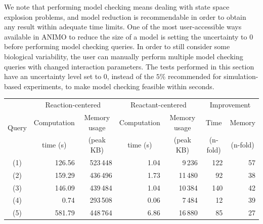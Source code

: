 \documentclass{llncs}
\begin{document}
We note that performing model checking means dealing with state space explosion problems,
and model reduction is recommendable in order to obtain any result within adequate time limits. One of the
most user-accessible ways available in ANIMO to reduce the size of a model is setting the uncertainty to 0
before performing model checking queries.
In order to still consider some biological variability, the user can manually perform multiple model checking queries with changed interaction parameters.
The tests performed in this section have an uncertainty level set to 0, instead of the $5\%$ recommended for simulation-based experiments, to
make model checking feasible within seconds.


\begin{table}[htbp]
  \begin{center}
    \begin{tabular}{|c||r|r||r|r||r|r|}
      \hline
       \multirow{3}{*}{Query} & \multicolumn{2}{c||}{Reaction-centered}	   & \multicolumn{2}{c||}{Reactant-centered} & \multicolumn{2}{c|}{Improvement}\\
      \cline{2-7}
       & \multicolumn{1}{c|}{Computation} & \multicolumn{1}{c||}{Memory usage} & \multicolumn{1}{c|}{Computation} & \multicolumn{1}{c||}{Memory usage} & \multicolumn{1}{c|}{Time} & \multicolumn{1}{c|}{Memory} \\
       & \multicolumn{1}{c|}{time (s)}    & \multicolumn{1}{c||}{(peak KB)}    & \multicolumn{1}{c|}{time (s)} & \multicolumn{1}{c||}{(peak KB)} & \multicolumn{1}{c|}{(n-fold)} & \multicolumn{1}{c|}{(n-fold)}\\
      \hline
      \hline
      (1) & 126.56 & 523\,{}448 & 1.04 & 9\,{}236 & 122 & 57 \\ %
      \hline
      (2) & 159.29 & 436\,{}496 & 1.73 & 11\,{}480 & 92 & 38 \\ %
      \hline
      (3) & 146.09 & 439\,{}484 & 1.04 & 10\,{}384 & 140 & 42 \\ %
      \hline
      (4) & 0.74 & 293\,{}508 & 0.06 & 7\,{}484 & 12 & 39 \\ %
      \hline
      (5) & 581.79 & 448\,{}764 & 6.86 & 16\,{}880 & 85 & 27 \\ %

\end{tabular}
\end{center}
\end{table}
\end{document}
